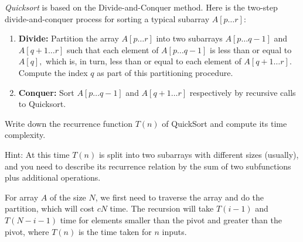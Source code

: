 \begin{exercise}[]{\textit{Quicksort} is based on the Divide-and-Conquer method. Here is the two-step divide-and-conquer process for sorting a typical subarray $A[p \ldots r]$:
    \begin{enumerate}

    	\item
    	\textbf{Divide:} Partition the array $A[p \ldots r]$ into two subarrays $A[p \ldots q-1]$ and $A[q+1 \ldots r]$ such that each element of $A[p \ldots q-1]$ is less than or equal to $A[q],$ which is, in turn, less than or equal to each element of $A[q+1 \ldots r].$ Compute the index $q$ as part of this partitioning procedure.
    	
    	\item
    	\textbf{Conquer:} Sort $A[p \ldots q-1]$ and $A[q+1 \ldots r]$ respectively by recursive calls to Quicksort.
    	
    \end{enumerate}
    Write down the recurrence function $T(n)$ of QuickSort and compute its time complexity.

    {\color{purple}Hint: At this time $T(n)$ is split into two subarrays with different sizes (usually), and you need to describe its recurrence relation by the sum of two subfunctions plus additional operations.}
}
  \begin{solution}
    For array $A$ of the size $N$, we first need to traverse the array and do the partition, which will cost $cN$ time. The recursion will take $T(i-1)$ and $T(N-i-1)$ time for elements smaller than the pivot and greater than the pivot, where $T(n)$ is the time taken for $n$ inputs.


\end{solution}
\end{exercise}
